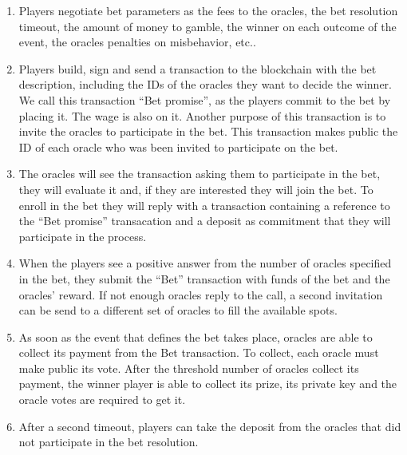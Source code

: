 \begin{enumerate}
  \item Players negotiate bet parameters as the fees to the oracles, the bet
      resolution timeout, the amount of money to gamble, the winner on each
      outcome of the event, the oracles penalties on misbehavior, etc..
  \item Players build, sign and send a transaction to the blockchain with the
      bet description, including the IDs of the oracles they want to decide the
      winner.
    We call this transaction ``Bet promise'', as the players commit to the bet
      by placing it. The wage is also on it.
    Another purpose of this transaction is to invite the oracles to participate
      in the bet.
    This transaction makes public the ID of each oracle who was been invited
      to participate on the bet.
  \item The oracles will see the transaction asking them to participate in the
      bet, they will evaluate it and, if they are interested they will join the
      bet.
    To enroll in the bet they will reply with a transaction containing a
      reference to the ``Bet promise'' transacation and a deposit as commitment
      that they will participate in the process.
  \item When the players see a positive answer from the number of oracles
      specified in the bet, they submit the ``Bet'' transaction with funds of
      the bet and the oracles' reward.
  	If not enough oracles reply to the call, a second invitation can be send to
  	  a different set of oracles to fill the available spots.
  \item As soon as the event that defines the bet  takes place, oracles are able
      to collect its payment from the Bet transaction.
      To collect, each oracle must make public its vote.
  	After the threshold number of oracles collect its payment, the winner player
  	  is able to collect its prize, its private key and the oracle votes are
  	  required to get it.
  \item After a second timeout, players can take the deposit from the oracles
  	  that did not participate in the bet resolution.
\end{enumerate}

